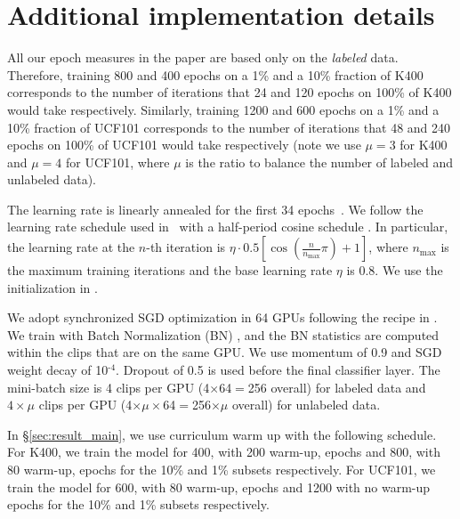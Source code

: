 \documentclass[10pt,twocolumn,letterpaper]{article}
\newcommand{\sref}[1]{\S\ref{#1}}
\begin{document}
\setcounter{figure}{0}
\renewcommand{\thefigure}{A.\arabic{figure}}	
\thispagestyle{empty}

%

\section {Additional implementation details } \label{sec:app_details} 

All our epoch measures in the paper are based only on the \textit{labeled} data. Therefore, training 800 and 400 epochs on a 1\% and a 10\% fraction of K400 corresponds to the number of iterations that 24 and 120 epochs on 100\% of K400 would take respectively. Similarly, training 1200 and 600 epochs on a 1\% and a 10\% fraction of UCF101 corresponds to the number of iterations that 48 and 240 epochs on 100\% of UCF101 would take respectively (note we use $\mu=3$ for K400 and $\mu=4$ for UCF101, where $\mu$ is the ratio to balance the number of labeled and unlabeled data).

The learning rate is linearly annealed for the first 34 epochs~\cite{Goyal2017}. 
We follow the learning rate schedule used in~\cite{feichtenhofer2019slowfast} with 
a half-period cosine schedule \cite{Loshchilov2016}. 
In particular, the learning rate at the $n$-th iteration is $\eta\cdot0.5[\cos(\frac{n}{n_\text{max}}\pi)+1]$, where $n_\text{max}$ is the maximum training iterations and the base learning rate $\eta$ is 0.8.
We use the initialization in \cite{He2015}.  

We adopt synchronized SGD optimization in 64 GPUs following the recipe in \cite{Goyal2017}.
We train with Batch Normalization (BN) \cite{Ioffe2015}, and the BN statistics are computed within {the clips that are on the same GPU.}
We use momentum of 0.9 and SGD weight decay of 10$^\text{-4}$. Dropout \cite{srivastava2014dropout} of 0.5 is used before the final classifier layer.
The mini-batch size is 4 clips per GPU (4$\times$64${=}$256 overall) for labeled data and $4\times \mu$  clips per GPU (4$\times\mu \times$64${=}$256$\times \mu$ overall) for unlabeled data. 

In \sref{sec:result_main}, we use curriculum warm up with the following schedule. For K400, we train the model for 400, with 200 warm-up, epochs and 800, with 80 warm-up, epochs for the 10\%  and 1\% subsets respectively. For UCF101, we train the model for 600, with 80 warm-up, epochs and 1200 with no warm-up epochs for the 10\%  and 1\% subsets respectively. 


{\small


}
\end{document}
